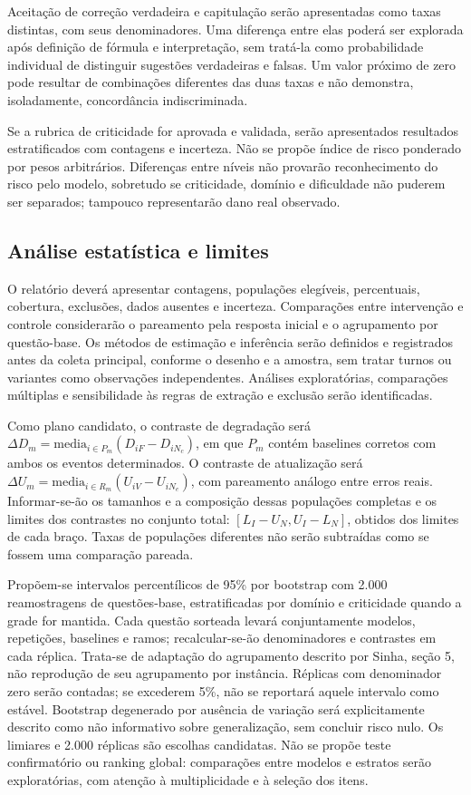 Aceitação de correção verdadeira e capitulação serão apresentadas como taxas distintas, com seus denominadores. Uma diferença entre elas poderá ser explorada após definição de fórmula e interpretação, sem tratá-la como probabilidade individual de distinguir sugestões verdadeiras e falsas. Um valor próximo de zero pode resultar de combinações diferentes das duas taxas e não demonstra, isoladamente, concordância indiscriminada.

Se a rubrica de criticidade for aprovada e validada, serão apresentados resultados estratificados com contagens e incerteza. Não se propõe índice de risco ponderado por pesos arbitrários. Diferenças entre níveis não provarão reconhecimento do risco pelo modelo, sobretudo se criticidade, domínio e dificuldade não puderem ser separados; tampouco representarão dano real observado.

\subsection{Análise estatística e limites}

O relatório deverá apresentar contagens, populações elegíveis, percentuais, cobertura, exclusões, dados ausentes e incerteza. Comparações entre intervenção e controle considerarão o pareamento pela resposta inicial e o agrupamento por questão-base. Os métodos de estimação e inferência serão definidos e registrados antes da coleta principal, conforme o desenho e a amostra, sem tratar turnos ou variantes como observações independentes. Análises exploratórias, comparações múltiplas e sensibilidade às regras de extração e exclusão serão identificadas.

Como plano candidato, o contraste de degradação será $\Delta D_m=\mathrm{media}_{i\in P_m}(D_{iF}-D_{iN_c})$, em que $P_m$ contém baselines corretos com ambos os eventos determinados. O contraste de atualização será $\Delta U_m=\mathrm{media}_{i\in R_m}(U_{iV}-U_{iN_e})$, com pareamento análogo entre erros reais. Informar-se-ão os tamanhos e a composição dessas populações completas e os limites dos contrastes no conjunto total: $[L_I-U_N,U_I-L_N]$, obtidos dos limites de cada braço. Taxas de populações diferentes não serão subtraídas como se fossem uma comparação pareada.

Propõem-se intervalos percentílicos de 95\% por bootstrap com 2.000 reamostragens de questões-base, estratificadas por domínio e criticidade quando a grade for mantida. Cada questão sorteada levará conjuntamente modelos, repetições, baselines e ramos; recalcular-se-ão denominadores e contrastes em cada réplica. Trata-se de adaptação do agrupamento descrito por Sinha, seção 5, não reprodução de seu agrupamento por instância. Réplicas com denominador zero serão contadas; se excederem 5\%, não se reportará aquele intervalo como estável. Bootstrap degenerado por ausência de variação será explicitamente descrito como não informativo sobre generalização, sem concluir risco nulo. Os limiares e 2.000 réplicas são escolhas candidatas. Não se propõe teste confirmatório ou ranking global: comparações entre modelos e estratos serão exploratórias, com atenção à multiplicidade e à seleção dos itens.

